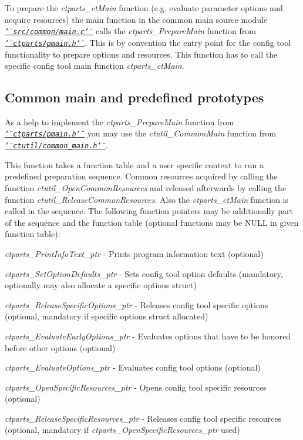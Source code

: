 To prepare the {\itshape ctparts\+\_\+ct\+Main} function (e.\+g. evaluate parameter options and acquire resources) the main function in the common main source module \href{main_8c.html}{\tt {\itshape \char`\"{}src/common/main.\+c\char`\"{}}} calls the {\itshape ctparts\+\_\+\+Prepare\+Main} function from \href{pmain_8h.html}{\tt {\itshape \char`\"{}ctparts/pmain.\+h\char`\"{}}}. This is by convention the entry point for the config tool functionality to prepare options and resources. This function has to call the specific config tool main function {\itshape ctparts\+\_\+ct\+Main}.

\subsection*{Common main and predefined prototypes}

As a help to implement the {\itshape ctparts\+\_\+\+Prepare\+Main} function from \href{pmain_8h.html}{\tt {\itshape \char`\"{}ctparts/pmain.\+h\char`\"{}}} you may use the {\itshape ctutil\+\_\+\+Common\+Main} function from \href{common_main_8h.html}{\tt {\itshape \char`\"{}ctutil/common\+\_\+main.\+h\char`\"{}}}.

This function takes a function table and a user specific context to run a predefined preparation sequence. Common resources acquired by calling the function {\itshape ctutil\+\_\+\+Open\+Common\+Resources} and released afterwards by calling the function {\itshape ctutil\+\_\+\+Release\+Common\+Resources}. Also the {\itshape ctparts\+\_\+ct\+Main} function is called in the sequence. The following function pointers may be additionally part of the sequence and the function table (optional functions may be N\+U\+LL in given function table)\+:
\begin{DoxyItemize}
\item {\itshape ctparts\+\_\+\+Print\+Info\+Text\+\_\+ptr} -\/ Prints program information text (optional)
\item {\itshape ctparts\+\_\+\+Set\+Option\+Defaults\+\_\+ptr} -\/ Sets config tool option defaults (mandatory, optionally may also allocate a specific options struct)
\item {\itshape ctparts\+\_\+\+Release\+Specific\+Options\+\_\+ptr} -\/ Releases config tool specific options (optional, mandatory if specific options struct allocated)
\item {\itshape ctparts\+\_\+\+Evaluate\+Early\+Options\+\_\+ptr} -\/ Evaluates options that have to be honored before other options (optional)
\item {\itshape ctparts\+\_\+\+Evaluate\+Options\+\_\+ptr} -\/ Evaluates config tool options (optional)
\item {\itshape ctparts\+\_\+\+Open\+Specific\+Resources\+\_\+ptr} -\/ Opens config tool specific resources (optional)
\item {\itshape ctparts\+\_\+\+Release\+Specific\+Resources\+\_\+ptr} -\/ Releases config tool specific resources (optional, mandatory if {\itshape ctparts\+\_\+\+Open\+Specific\+Resources\+\_\+ptr} used)
\end{DoxyItemize}


